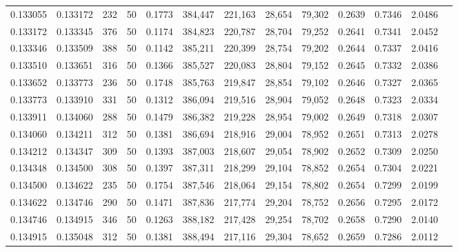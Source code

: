 \begin{tabular}{rrrrrrrrrrrrr}
0.133055 & 0.133172 &   232 &  50 &                                     0.1773 & 384,447 & 221,163 &  28,654 &  79,302 & 0.2639 & 0.7346 & 2.0486 \\
0.133172 & 0.133345 &   376 &  50 &                                     0.1174 & 384,823 & 220,787 &  28,704 &  79,252 & 0.2641 & 0.7341 & 2.0452 \\
0.133346 & 0.133509 &   388 &  50 &                                     0.1142 & 385,211 & 220,399 &  28,754 &  79,202 & 0.2644 & 0.7337 & 2.0416 \\
0.133510 & 0.133651 &   316 &  50 &                                     0.1366 & 385,527 & 220,083 &  28,804 &  79,152 & 0.2645 & 0.7332 & 2.0386 \\
0.133652 & 0.133773 &   236 &  50 &                                     0.1748 & 385,763 & 219,847 &  28,854 &  79,102 & 0.2646 & 0.7327 & 2.0365 \\
0.133773 & 0.133910 &   331 &  50 &                                     0.1312 & 386,094 & 219,516 &  28,904 &  79,052 & 0.2648 & 0.7323 & 2.0334 \\
0.133911 & 0.134060 &   288 &  50 &                                     0.1479 & 386,382 & 219,228 &  28,954 &  79,002 & 0.2649 & 0.7318 & 2.0307 \\
0.134060 & 0.134211 &   312 &  50 &                                     0.1381 & 386,694 & 218,916 &  29,004 &  78,952 & 0.2651 & 0.7313 & 2.0278 \\
0.134212 & 0.134347 &   309 &  50 &                                     0.1393 & 387,003 & 218,607 &  29,054 &  78,902 & 0.2652 & 0.7309 & 2.0250 \\
0.134348 & 0.134500 &   308 &  50 &                                     0.1397 & 387,311 & 218,299 &  29,104 &  78,852 & 0.2654 & 0.7304 & 2.0221 \\
0.134500 & 0.134622 &   235 &  50 &                                     0.1754 & 387,546 & 218,064 &  29,154 &  78,802 & 0.2654 & 0.7299 & 2.0199 \\
0.134622 & 0.134746 &   290 &  50 &                                     0.1471 & 387,836 & 217,774 &  29,204 &  78,752 & 0.2656 & 0.7295 & 2.0172 \\
0.134746 & 0.134915 &   346 &  50 &                                     0.1263 & 388,182 & 217,428 &  29,254 &  78,702 & 0.2658 & 0.7290 & 2.0140 \\
0.134915 & 0.135048 &   312 &  50 &                                     0.1381 & 388,494 & 217,116 &  29,304 &  78,652 & 0.2659 & 0.7286 & 2.0112 \\

\end{tabular}
